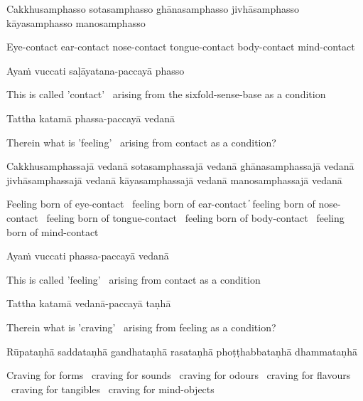 Cakkhusamphasso sotasamphasso ghānasamphasso jivhāsamphasso kāyasamphasso manosamphasso

\begin{cprenglish}
  Eye-contact ear-contact nose-contact tongue-contact body-contact mind-contact
\end{cprenglish}

Ayaṁ vuccati saḷāyatana-paccayā phasso

\begin{cprenglish}
  This is called 'contact' \breathmark\ arising from the sixfold-sense-base as a condition
\end{cprenglish}

Tattha katamā phassa-paccayā vedanā

\begin{cprenglish}
  Therein what is 'feeling' \breathmark\ arising from contact as a condition?
\end{cprenglish}

Cakkhusamphassajā vedanā sotasamphassajā vedanā ghānasamphassajā vedanā jivhāsamphassajā vedanā kāyasamphassajā vedanā manosamphassajā vedanā

\begin{cprenglish}
  Feeling born of eye-contact \breathmark\ feeling born of ear-contact  ̓
  feeling born of nose-contact \breathmark\ feeling born of tongue-contact \breathmark\ feeling born of body-contact \breathmark\ feeling born of mind-contact
\end{cprenglish}

Ayaṁ vuccati phassa-paccayā vedanā

\begin{cprenglish}
  This is called 'feeling' \breathmark\ arising from contact as a condition
\end{cprenglish}

Tattha katamā vedanā-paccayā taṇhā

\begin{cprenglish}
  Therein what is 'craving' \breathmark\ arising from feeling as a condition?
\end{cprenglish}

Rūpataṇhā saddataṇhā gandhataṇhā rasataṇhā phoṭṭhabbataṇhā dhammataṇhā

\begin{cprenglish}
  Craving for forms \breathmark\ craving for sounds \breathmark\ craving for odours \breathmark\ craving for flavours \breathmark\ craving for tangibles \breathmark\ craving for mind-objects
\end{cprenglish}


